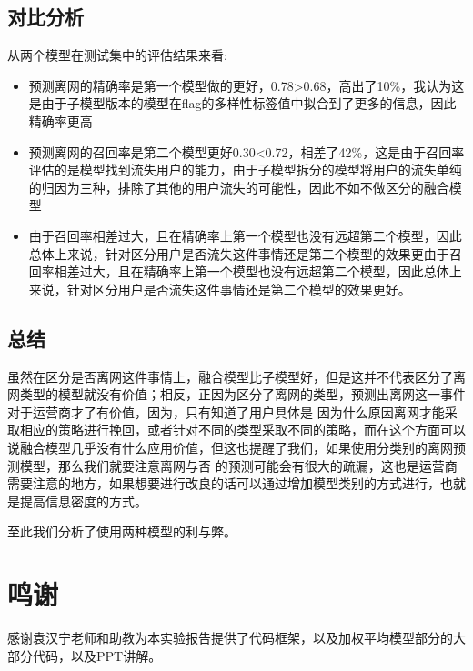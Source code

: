 \documentclass{article}
\begin{document}
\subsection{对比分析}
从两个模型在测试集中的评估结果来看:
\begin{itemize}
	\item 预测离网的精确率是第一个模型做的更好，0.78>0.68，高出了10\%，我认为这是由于子模型版本的模型在flag的多样性标签值中拟合到了更多的信息，因此精确率更高 
	\item 预测离网的召回率是第二个模型更好0.30<0.72，相差了42\%，这是由于召回率评估的是模型找到流失用户的能力，由于子模型拆分的模型将用户的流失单纯的归因为三种，排除了其他的用户流失的可能性，因此不如不做区分的融合模型
	\item 由于召回率相差过大，且在精确率上第一个模型也没有远超第二个模型，因此总体上来说，针对区分用户是否流失这件事情还是第二个模型的效果更由于召回率相差过大，且在精确率上第一个模型也没有远超第二个模型，因此总体上来说，针对区分用户是否流失这件事情还是第二个模型的效果更好。
\end{itemize}
\subsection{总结}
虽然在区分是否离网这件事情上，融合模型比子模型好，但是这并不代表区分了离网类型的模型就没有价值；相反，正因为区分了离网的类型，预测出离网这一事件对于运营商才了有价值，因为，只有知道了用户具体是
因为什么原因离网才能采取相应的策略进行挽回，或者针对不同的类型采取不同的策略，而在这个方面可以说融合模型几乎没有什么应用价值，但这也提醒了我们，如果使用分类别的离网预测模型，那么我们就要注意离网与否
的预测可能会有很大的疏漏，这也是运营商需要注意的地方，如果想要进行改良的话可以通过增加模型类别的方式进行，也就是提高信息密度的方式。


至此我们分析了使用两种模型的利与弊。


\section{鸣谢}
感谢袁汉宁老师和助教为本实验报告提供了代码框架，以及加权平均模型部分的大部分代码，以及PPT讲解。

  
\end{document}
